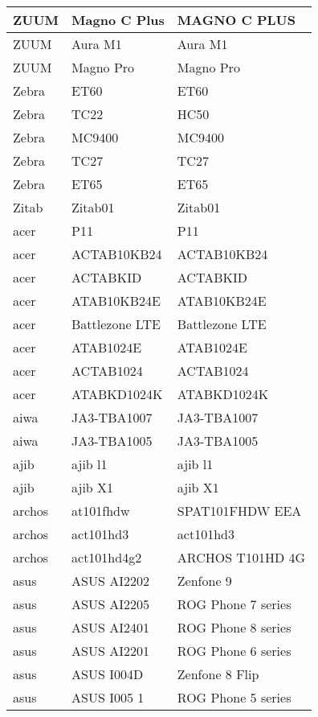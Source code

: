 \begin{tabularx}{\linewidth}{|l|X|X|}
        ZUUM & Magno C Plus & MAGNO C PLUS \\ \hline
        ZUUM & Aura M1 & Aura M1 \\ \hline
        ZUUM & Magno Pro & Magno Pro \\ \hline
        Zebra & ET60 & ET60 \\ \hline
        Zebra & TC22 & HC50 \\ \hline
        Zebra & MC9400 & MC9400 \\ \hline
        Zebra & TC27 & TC27 \\ \hline
        Zebra & ET65 & ET65 \\ \hline
        Zitab & Zitab01 & Zitab01 \\ \hline
        acer & P11 & P11 \\ \hline
        acer & ACTAB10KB24 & ACTAB10KB24 \\ \hline
        acer & ACTABKID & ACTABKID \\ \hline
        acer & ATAB10KB24E & ATAB10KB24E \\ \hline
        acer & Battlezone LTE & Battlezone LTE \\ \hline
        acer & ATAB1024E & ATAB1024E \\ \hline
        acer & ACTAB1024 & ACTAB1024 \\ \hline
        acer & ATABKD1024K & ATABKD1024K \\ \hline
        aiwa & JA3-TBA1007 & JA3-TBA1007 \\ \hline
        aiwa & JA3-TBA1005 & JA3-TBA1005 \\ \hline
        ajib & ajib l1 & ajib l1 \\ \hline
        ajib & ajib X1 & ajib X1 \\ \hline
        archos & at101fhdw & SPAT101FHDW EEA \\ \hline
        archos & act101hd3 & act101hd3 \\ \hline
        archos & act101hd4g2 & ARCHOS T101HD 4G \\ \hline
        asus & ASUS AI2202 & Zenfone 9 \\ \hline
        asus & ASUS AI2205 & ROG Phone 7 series \\ \hline
        asus & ASUS AI2401 & ROG Phone 8 series \\ \hline
        asus & ASUS AI2201 & ROG Phone 6 series \\ \hline
        asus & ASUS I004D & Zenfone 8 Flip \\ \hline
        asus & ASUS I005 1 & ROG Phone 5 series \\ \hline

\end{tabularx}
